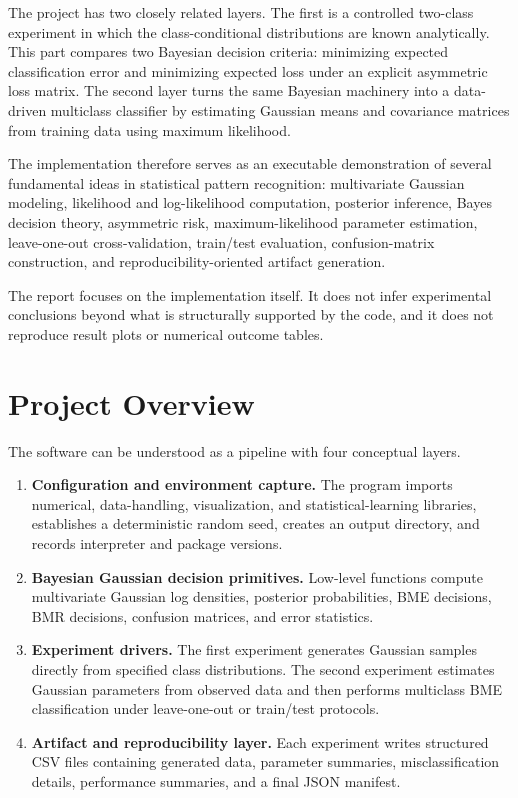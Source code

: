 \documentclass[11pt,a4paper]{article}
\begin{document}
The project has two closely related layers. The first is a controlled two-class experiment in which the class-conditional distributions are known analytically. This part compares two Bayesian decision criteria: minimizing expected classification error and minimizing expected loss under an explicit asymmetric loss matrix. The second layer turns the same Bayesian machinery into a data-driven multiclass classifier by estimating Gaussian means and covariance matrices from training data using maximum likelihood.

The implementation therefore serves as an executable demonstration of several fundamental ideas in statistical pattern recognition: multivariate Gaussian modeling, likelihood and log-likelihood computation, posterior inference, Bayes decision theory, asymmetric risk, maximum-likelihood parameter estimation, leave-one-out cross-validation, train/test evaluation, confusion-matrix construction, and reproducibility-oriented artifact generation.

The report focuses on the implementation itself. It does not infer experimental conclusions beyond what is structurally supported by the code, and it does not reproduce result plots or numerical outcome tables.

\section{Project Overview}
The software can be understood as a pipeline with four conceptual layers.

\begin{enumerate}
    \item \textbf{Configuration and environment capture.} The program imports numerical, data-handling, visualization, and statistical-learning libraries, establishes a deterministic random seed, creates an output directory, and records interpreter and package versions.
    \item \textbf{Bayesian Gaussian decision primitives.} Low-level functions compute multivariate Gaussian log densities, posterior probabilities, BME decisions, BMR decisions, confusion matrices, and error statistics.
    \item \textbf{Experiment drivers.} The first experiment generates Gaussian samples directly from specified class distributions. The second experiment estimates Gaussian parameters from observed data and then performs multiclass BME classification under leave-one-out or train/test protocols.
    \item \textbf{Artifact and reproducibility layer.} Each experiment writes structured CSV files containing generated data, parameter summaries, misclassification details, performance summaries, and a final JSON manifest.
\end{enumerate}
\end{document}
